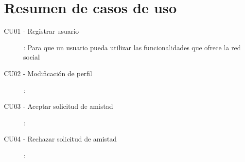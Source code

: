 \documentclass[12pt, a4paper, titlepage]{article}
\begin{document}
\section{Resumen de casos de uso}

\begin{description}
    \item [CU01 - Registrar usuario]: Para que un usuario pueda utilizar las funcionalidades que ofrece la red social
   	\item [CU02 - Modificación de perfil]:
    \item [CU03 - Aceptar solicitud de amistad]:
    
    \item [CU04 - Rechazar solicitud de amistad]:
    

\end{description}
\end{document}
